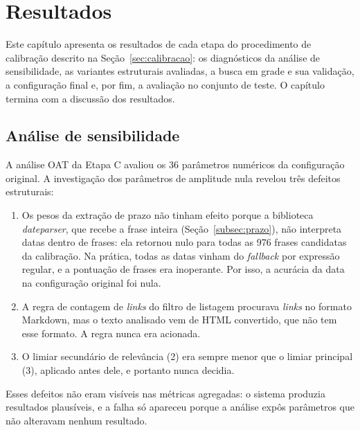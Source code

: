 \chapter[RESULTADOS]{Resultados}
\label{cap:resultados}

Este capítulo apresenta os resultados de cada etapa do procedimento de
calibração descrito na Seção~\ref{sec:calibracao}: os diagnósticos da análise
de sensibilidade, as variantes estruturais avaliadas, a busca em grade e sua
validação, a configuração final e, por fim, a avaliação no conjunto de teste.
O capítulo termina com a discussão dos resultados.

\section{Análise de sensibilidade}
\label{sec:res_sensibilidade}

A análise OAT da Etapa C avaliou os 36 parâmetros numéricos da configuração
original. A investigação dos parâmetros de amplitude nula revelou três defeitos
estruturais:

\begin{enumerate}
  \item Os pesos da extração de prazo não tinham efeito porque a biblioteca
    \textit{dateparser}, que recebe a frase inteira (Seção~\ref{subsec:prazo}), não
    interpreta datas dentro de frases: ela retornou nulo para todas as 976
    frases candidatas da calibração. Na prática, todas as datas vinham do
    \textit{fallback} por expressão regular, e a pontuação de frases era
    inoperante. Por isso, a acurácia da data na configuração original foi
    nula.
  \item A regra de contagem de \textit{links} do filtro de listagem procurava
    \textit{links} no formato Markdown, mas o texto analisado vem de HTML
    convertido, que não tem esse formato. A regra nunca era acionada.
  \item O limiar secundário de relevância (2) era sempre menor que o limiar
    principal (3), aplicado antes dele, e portanto nunca decidia.
\end{enumerate}

Esses defeitos não eram visíveis nas métricas agregadas: o sistema produzia
resultados plausíveis, e a falha só apareceu porque a análise expôs
parâmetros que não alteravam nenhum resultado.

